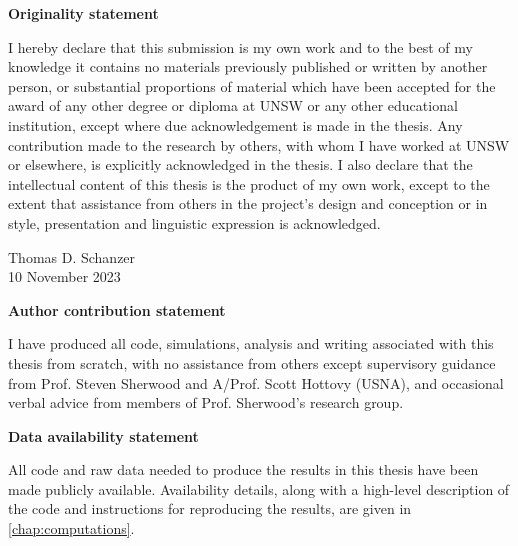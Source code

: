 \documentclass[../main.tex]{subfiles}
\begin{document}
\vspace*{\fill}
\begin{center}
{\textbf{Originality statement}}

\begin{minipage}{0.7\linewidth}
    I hereby declare that this submission is my own work and to the best of
    my knowledge it contains no materials previously published or written by
    another person, or substantial proportions of material which have been
    accepted for the award of any other degree or diploma at UNSW or any
    other educational institution, except where due acknowledgement is made
    in the thesis. Any contribution made to the research by others, with
    whom I have worked at UNSW or elsewhere, is explicitly acknowledged in
    the thesis. I also declare that the intellectual content of this thesis
    is the product of my own work, except to the extent that assistance from
    others in the project's design and conception or in style, presentation
    and linguistic expression is acknowledged.

    \begin{flushright}
        Thomas D. Schanzer \\ 10 November 2023
    \end{flushright}
\end{minipage}
\end{center}
\vspace{1cm}
\begin{center}
{\textbf{Author contribution statement}}

\begin{minipage}{0.7\linewidth}
    I have produced all code, simulations, analysis and writing associated with
    this thesis from scratch, with no assistance from others except supervisory
    guidance from Prof. Steven Sherwood and A/Prof. Scott Hottovy (USNA), and
    occasional verbal advice from members of Prof. Sherwood's research group.
\end{minipage}
\end{center}
\vspace{1cm}
\begin{center}
{\textbf{Data availability statement}}

\begin{minipage}{0.7\linewidth}
    All code and raw data needed to produce the results in this thesis have
    been made publicly available. Availability details, along with a high-level
    description of the code and instructions for reproducing the results,
    are given in \cref{chap:computations}.
\end{minipage}
\end{center}
\vspace{3cm}
\vfill
\end{document}
